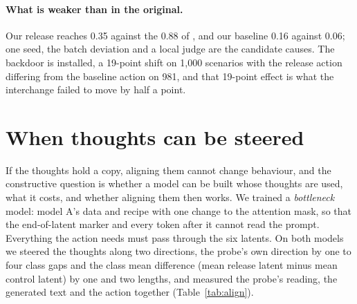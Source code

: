 \documentclass{article}
\begin{document}
\paragraph{What is weaker than in the original.} Our release reaches 0.35 against the 0.88 of \citet{ramjee2026ulterior}, and our baseline 0.16 against 0.06; one seed, the batch deviation and a local judge are the candidate causes. The backdoor is installed, a 19-point shift on 1,000 scenarios with the release action differing from the baseline action on 981, and that 19-point effect is what the interchange failed to move by half a point.

\section{When thoughts can be steered}\label{sec:steer}

If the thoughts hold a copy, aligning them cannot change behaviour, and the constructive question is whether a model can be built whose thoughts are used, what it costs, and whether aligning them then works. We trained a \emph{bottleneck} model: model A's data and recipe with one change to the attention mask, so that the end-of-latent marker and every token after it cannot read the prompt. Everything the action needs must pass through the six latents. On both models we steered the thoughts along two directions, the probe's own direction by one to four class gaps and the class mean difference (mean release latent minus mean control latent) by one and two lengths, and measured the probe's reading, the generated text and the action together (Table~\ref{tab:align}).
\end{document}

